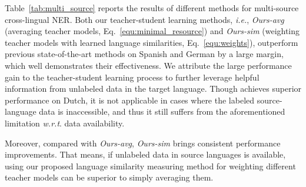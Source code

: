 \documentclass[11pt,a4paper]{article}
\newcommand\ie{\textit{i.e.}}
\newcommand\wrt{\textit{w.r.t}}
\begin{document}
	Table~\ref{tab:multi_source} reports the results of different methods for multi-source cross-lingual NER. 
	Both our teacher-student learning methods, \ie, \textit{Ours-avg} (averaging teacher models, Eq.~\ref{equ:minimal_resource}) and \textit{Ours-sim} (weighting teacher models with learned language similarities, Eq.~\ref{equ:weights}), outperform previous state-of-the-art methods on Spanish and German by a large margin, which well demonstrates their effectiveness. We attribute the large performance gain to the teacher-student learning process to further leverage helpful information from unlabeled data in the target language. Though \citet{moon2019lingua} achieves superior performance on Dutch, it is not applicable in cases where the labeled source-language data is inaccessible, and thus it still suffers from the aforementioned limitation \wrt. data availability.


	Moreover, compared with \textit{Ours-avg}, \textit{Ours-sim} brings consistent performance improvements. That means, if unlabeled data in source languages is available, using our proposed language similarity measuring method for weighting different teacher models can be superior to simply averaging them.

	\begin{table}[t]
		\centering
		\setlength{\tabcolsep}{1mm}
		\caption{Ablation study of the proposed teacher-student learning method for cross-lingual NER. \textbf{HL}: Hard Label; \textbf{MT}: Direct Model Transfer; \textbf{*-avg}: averaging source-language models; \textbf{*-sim}: weighting source-language models with learned language similarities.}
		\label{tab:ablation}
	\end{table}
\end{document}
